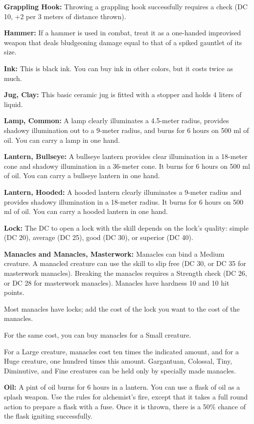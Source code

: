 \textbf{Grappling Hook:} Throwing a grappling hook successfully requires a  check (DC 10, +2 per 3 meters of distance thrown).

\textbf{Hammer:} If a hammer is used in combat, treat it as a one-handed improvised weapon that deals bludgeoning damage equal to that of a spiked gauntlet of its size.

\textbf{Ink:} This is black ink. You can buy ink in other colors, but it costs twice as much.

\textbf{Jug, Clay:} This basic ceramic jug is fitted with a stopper and holds 4 liters of liquid.

\textbf{Lamp, Common:} A lamp clearly illuminates a 4.5-meter radius, provides shadowy illumination out to a 9-meter radius, and burns for 6 hours on 500 ml of oil. You can carry a lamp in one hand.

\textbf{Lantern, Bullseye:} A bullseye lantern provides clear illumination in a 18-meter cone and shadowy illumination in a 36-meter cone. It burns for 6 hours on 500 ml of oil. You can carry a bullseye lantern in one hand.

\textbf{Lantern, Hooded:} A hooded lantern clearly illuminates a 9-meter radius and provides shadowy illumination in a 18-meter radius. It burns for 6 hours on 500 ml of oil. You can carry a hooded lantern in one hand.

\textbf{Lock:} The DC to open a lock with the  skill depends on the lock's quality: simple (DC 20), average (DC 25), good (DC 30), or superior (DC 40).

\textbf{Manacles and Manacles, Masterwork:} Manacles can bind a Medium creature. A manacled creature can use the  skill to slip free (DC 30, or DC 35 for masterwork manacles). Breaking the manacles requires a Strength check (DC 26, or DC 28 for masterwork manacles). Manacles have hardness 10 and 10 hit points.

Most manacles have locks; add the cost of the lock you want to the cost of the manacles.

For the same cost, you can buy manacles for a Small creature.

For a Large creature, manacles cost ten times the indicated amount, and for a Huge creature, one hundred times this amount. Gargantuan, Colossal, Tiny, Diminutive, and Fine creatures can be held only by specially made manacles.

\textbf{Oil:} A pint of oil burns for 6 hours in a lantern. You can use a flask of oil as a splash weapon. Use the rules for alchemist's fire, except that it takes a full round action to prepare a flask with a fuse. Once it is thrown, there is a 50\% chance of the flask igniting successfully.

